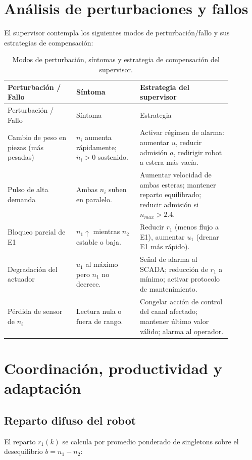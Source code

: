 \section{Análisis de perturbaciones y fallos}

El supervisor contempla los siguientes modos de perturbación/fallo y sus estrategias de compensación:

\begin{longtable}{@{}P{0.27\linewidth}P{0.25\linewidth}P{0.36\linewidth}@{}}
\caption{Modos de perturbación, síntomas y estrategia de compensación del supervisor.}
\label{tab:sv_faults}\\
\toprule
Perturbación / Fallo & Síntoma & Estrategia del supervisor \\ \midrule \endfirsthead
\toprule Perturbación / Fallo & Síntoma & Estrategia \\ \midrule \endhead
Cambio de peso en piezas (más pesadas) & $n_i$ aumenta rápidamente; $\dot{n}_i > 0$ sostenido. & Activar régimen de alarma: aumentar $u$, reducir admisión $a$, redirigir robot a estera más vacía.\\
Pulso de alta demanda & Ambas $n_i$ suben en paralelo. & Aumentar velocidad de ambas esteras; mantener reparto equilibrado; reducir admisión si $n_{max} > 2.4$.\\
Bloqueo parcial de E1 & $n_1 \uparrow$ mientras $n_2$ estable o baja. & Reducir $r_1$ (menos flujo a E1), aumentar $u_1$ (drenar E1 más rápido).\\
Degradación del actuador & $u_1$ al máximo pero $n_1$ no decrece. & Señal de alarma al SCADA; reducción de $r_1$ a mínimo; activar protocolo de mantenimiento.\\
Pérdida de sensor de $n_i$ & Lectura nula o fuera de rango. & Congelar acción de control del canal afectado; mantener último valor válido; alarma al operador.\\
\bottomrule
\end{longtable}

\section{Coordinación, productividad y adaptación}

\subsection*{Reparto difuso del robot}

El reparto $r_1(k)$ se calcula por promedio ponderado de singletons sobre el desequilibrio $b=n_1-n_2$:

